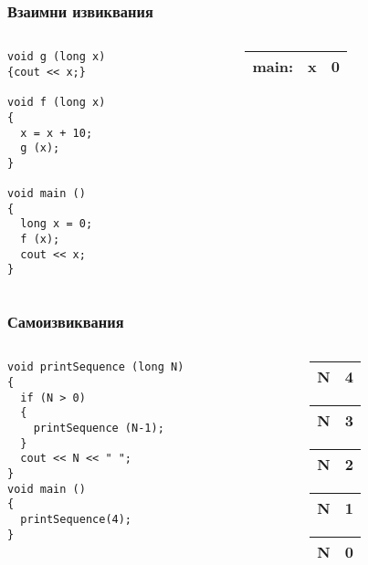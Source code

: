 \documentclass{beamer}
\begin{document}
\begin{frame}[fragile]
\frametitle{Взаимни извиквания}

\begin{columns}[t]
  \begin{column}{0.8\textwidth}
\begin{lstlisting}
void g (long x)
{cout << x;}

void f (long x)
{
  x = x + 10;
  g (x);
}

void main ()
{
  long x = 0;
  f (x);
  cout << x;
}

\end{lstlisting}
  \end{column}
  \begin{column}{0.2\textwidth}

    \begin{tabular}{c|c|c|}
    main: & x & 0 \\\hline

    \end{tabular}



  \end{column}
\end{columns}


\end{frame}


\begin{frame}[fragile]
\frametitle{Самоизвиквания}



\begin{columns}[t]
  \begin{column}{0.8\textwidth}
\begin{lstlisting}
void printSequence (long N)
{
  if (N > 0)
  {
    printSequence (N-1);
  }
  cout << N << " ";
}
void main ()
{
  printSequence(4);
}
\end{lstlisting}
  \end{column}
  \begin{column}{0.2\textwidth}

\pause
    \begin{tabular}{|c|c|}
    N & 4 \\\hline
    \end{tabular}
    \pause
    \begin{tabular}{|c|c|}
    N & 3 \\\hline
    \end{tabular}
    \pause
    \begin{tabular}{|c|c|}
    N & 2 \\\hline
    \end{tabular}
    \pause
    \begin{tabular}{|c|c|}
    N & 1 \\\hline
    \end{tabular}
    \pause
    \begin{tabular}{|c|c|}
    N & 0 \\\hline
    \end{tabular}


  \end{column}
\end{columns}

\end{frame}
\end{document}
